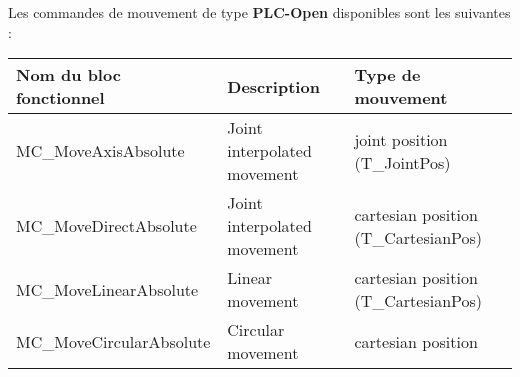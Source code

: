Les commandes de mouvement de type \textbf{PLC-Open} disponibles sont les suivantes :
\begin{center}
    \begin{tabular}{l|l|l}
        \textbf{Nom du bloc fonctionnel} & \textbf{Description} & \textbf{Type de mouvement} \\
        \hline
        MC\_MoveAxisAbsolute & Joint interpolated movement & joint position (T\_JointPos) \\
        MC\_MoveDirectAbsolute & Joint interpolated movement & cartesian position (T\_CartesianPos) \\
        MC\_MoveLinearAbsolute & Linear movement & cartesian position (T\_CartesianPos) \\
        MC\_MoveCircularAbsolute & Circular movement & cartesian position \\
    \end{tabular}
\end{center}    



